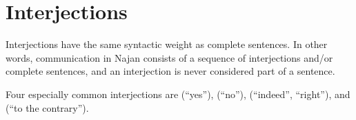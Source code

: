 \section{Interjections} \label{sec:interjections}

Interjections have the same syntactic weight as complete sentences. In other
words, communication in Najan consists of a sequence of interjections and/or
complete sentences, and an interjection is never considered part of a sentence.

Four especially common interjections are  (``yes''), 
(``no''),  (``indeed'', ``right''), and  (``to the
contrary'').
